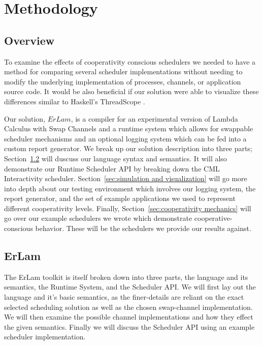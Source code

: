 \chapter{Methodology}
%
\label{chap:methodology}

\section{Overview}\label{sec:method overview}

To examine the effects of cooperativity conscious schedulers we needed to have 
a method for comparing several scheduler implementations without needing to 
modify the underlying implementation of processes, channels, or application
source code. It would be also beneficial if our solution were able to visualize
these differences similar to Haskell's ThreadScope \cite{jones2009parallel}.

Our solution, $ErLam$, is a compiler for an experimental version of Lambda 
Calculus with Swap Channels and a runtime system which allows for swappable 
scheduler mechanisms and an optional logging system which can be fed into a 
custom report generator.
We break up our solution description into three parts; 
Section~\ref{sec:erlam}
will duscuss our language syntax and semantics. It will also demonstrate our
Runtime Scheduler API by breaking down the CML Interactivity scheduler. 
Section~\ref{sec:simulation and visualization} 
will go more into depth about
our testing environment which involves our logging system, the report generator,
and the set of example applications we used to represent different cooperativity
levels. 
Finally, Section~\ref{sec:cooperativity mechanics} will go over our
example schedulers we wrote which demonstrate cooperative-conscious behavior. 
These will be the schedulers we provide our results against.

\section{ErLam}\label{sec:erlam}

The ErLam toolkit is itself broken down into three parts, the language and its
semantics, the Runtime System, and the Scheduler API. We will first lay out the
language and it's basic semantics, as the finer-details are reliant on the exact
selected scheduling solution as well as the chosen swap-channel implementation.
We will then examine the possible channel implementations and how they effect
the given semantics. Finally we will discuss the Scheduler API using an example
scheduler implementation.

